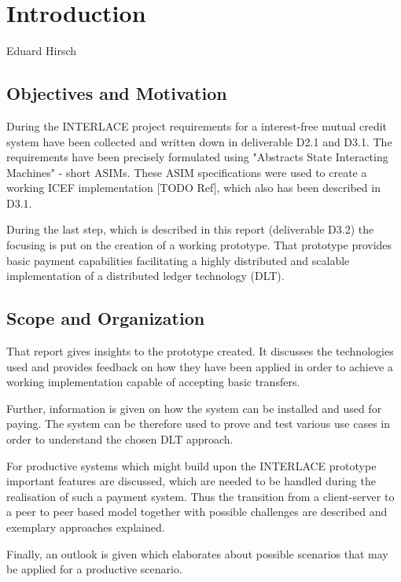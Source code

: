 \chapter{Introduction}
\label{ch:Introduction}

\vspace{-1cm}
\begin{center}
Eduard Hirsch
\end{center}


\section{Objectives and Motivation}

During the INTERLACE project requirements for a interest-free mutual credit system have been collected and written down in deliverable D2.1\cite{INTERLACE_D21} and D3.1\cite{INTERLACE_D31}. The requirements have been precisely formulated using "Abstracts State Interacting Machines" - short ASIMs. These ASIM specifications were used to create a working ICEF implementation [TODO Ref], which also has been described in D3.1.

During the last step, which is described in this report (deliverable D3.2) the focusing is put on the creation of a working prototype. That prototype provides basic payment capabilities facilitating a highly distributed and scalable implementation of a distributed ledger technology (DLT).

\section{Scope and Organization}

That report gives insights to the prototype created. It discusses the technologies used and provides feedback on how they have been applied in order to achieve a working implementation capable of accepting basic transfers.

Further, information is given on how the system can be installed and used for paying. The system can be therefore used to prove and test various use cases in order to understand the chosen DLT approach.

For productive systems which might build upon the INTERLACE prototype important features are discussed, which are needed to be handled during the realisation of such a payment system. Thus the transition from a client-server to a peer to peer based model together with possible challenges are described and exemplary approaches explained.

Finally, an outlook is given which elaborates about possible scenarios that may be applied for a productive scenario.

\newpage
